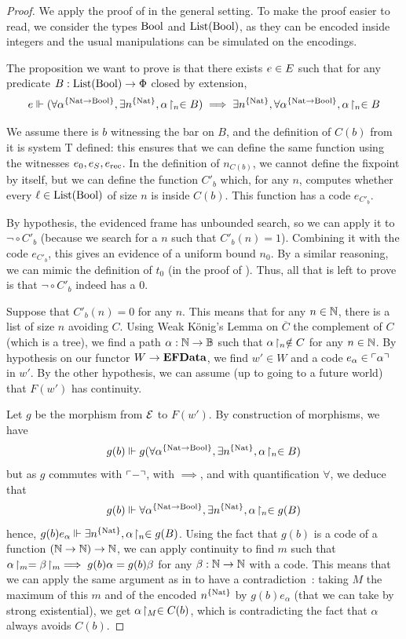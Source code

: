 \documentclass[a4paper,UKenglish,cleveref, autoref, thm-restate]{lipics-v2021}
\begin{document}
\begin{proof}
  We apply the proof of  in the general setting. To make the proof easier to read, we consider the types $\mathrm{Bool}$ and $\mathrm{List}(\mathrm{Bool})$, as they can be encoded inside integers and the usual manipulations can be simulated on the encodings.

  The proposition we want to prove is that there exists $e \in E$ such that for any predicate $B : \mathrm{List}(\mathrm{Bool}) \to \Phi$ closed by extension,
  \[
    e\Vdash (\forall \alpha^{\{\mathrm{Nat} \to \mathrm{Bool}\}}, \exists n^{\{\mathrm{Nat}\}}, {\alpha}\!\upharpoonright_{n} \in B) \implies
    \exists n^{\{\mathrm{Nat}\}}, \forall \alpha^{\{\mathrm{Nat} \to \mathrm{Bool}\}}, {\alpha}\!\upharpoonright_{n} \in B
  \]

  We assume there is $b$ witnessing the bar on $B$, and the definition of $C(b)$ from it is system T defined: this ensures that we can define the same function using the witnesses $e_{0},e_S,e_{\mathrm{rec}}$. In the definition of $n_{C(b)}$, we cannot define the fixpoint by itself, but we can define the function $C'_b$ which, for any $n$, computes whether every $\ell \in \mathrm{List}(\mathrm{Bool})$ of size $n$ is inside $C(b)$. This function has a code $e_{C'_b}$.

  By hypothesis, the evidenced frame has unbounded search, so we can apply it to $\lnot \circ C'_b$ (because we search for a $n$ such that $C'_b(n) = 1$). Combining it with the code $e_{C'_b}$, this gives an evidence of a uniform bound $n_0$. By a similar reasoning, we can mimic the definition of $t_0$ (in the proof of ).
  Thus, all that is left to prove is that $\lnot \circ C'_b$ indeed has a $0$.

  Suppose that $C'_b(n) = 0$ for any $n$. This means that for any $n \in \mathbb N$, there is a list of size $n$ avoiding $C$. Using Weak König's Lemma on $\overline{C}$ the complement of $C$ (which is a tree), we find a path $\alpha : \mathbb N \to \mathbb B$ such that ${\alpha}\!\upharpoonright_{n} \notin C$ for any $n \in \mathbb N$. By hypothesis on our functor $W \to \mathbf{EFData}$, we find $w' \in W$ and a code $e_\alpha \in \ulcorner\alpha\urcorner$ in $w'$. By the other hypothesis, we can assume (up to going to a future world) that $F(w')$ has continuity.

  Let $g$ be the morphism from $\mathcal{E}$ to $F(w')$. By construction of morphisms, we have
  \[g(b)\Vdash g(\forall \alpha^{\{\mathrm{Nat} \to \mathrm{Bool}\}}, \exists n^{\{\mathrm{Nat}\}}, {\alpha}\!\upharpoonright_{n} \in B)\]
  but as $g$ commutes with $\ulcorner-\urcorner$, with $\implies$, and with quantification $\forall$, we deduce that
  \[g(b)\Vdash \forall \alpha^{\{\mathrm{Nat} \to \mathrm{Bool}\}}, \exists n^{\{\mathrm{Nat}\}}, {\alpha}\!\upharpoonright_{n} \in g(B)\]
  hence, $g(b) e_{\alpha} \Vdash \exists n^{\{\mathrm{Nat}\}}, {\alpha}\!\upharpoonright_{n} \in g(B)$. Using the fact that $g(b)$ is a code of a function $(\mathbb N \to \mathbb N) \to \mathbb N$, we can apply continuity to find $m$ such that ${\alpha}\!\upharpoonright_{m} = {\beta}\!\upharpoonright_{m} \implies g(b) \alpha = g(b) \beta$ for any $\beta : \mathbb N \to \mathbb N$ with a code. This means that we can apply the same argument as in  to have a contradiction~: taking $M$ the maximum of this $m$ and of the encoded $n^{\{\mathrm{Nat}\}}$ by $g(b) e_{\alpha}$ (that we can take by strong existential), we get ${\alpha}\!\upharpoonright_{M} \in C(b)$, which is contradicting the fact that $\alpha$ always avoids $C(b)$.
\end{proof}
\end{document}
